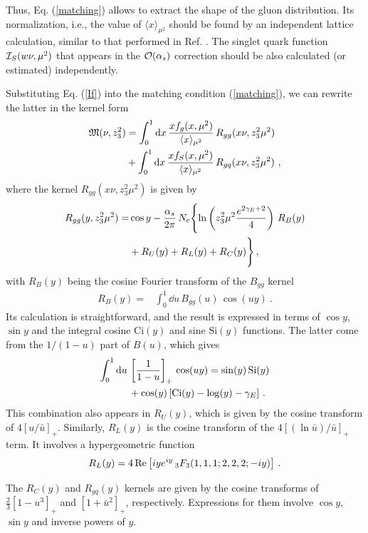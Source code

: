 Thus, Eq. (\ref{matching}) allows to extract the shape of the gluon distribution.
Its normalization, i.e., the value of $\langle x \rangle_{\mu^2}$ should be
found by an independent lattice calculation, similar to that performed
in Ref. \cite{Yang:2018bft}.
The singlet quark function ${\cal I}_S (w \nu, \mu^2)$ that appears in the
${\cal O} (\alpha_s)$ correction should be also calculated (or estimated)
independently.

Substituting Eq. (\ref{If}) into the matching condition (\ref{matching}), we can
rewrite the latter in the kernel form \cite{Radyushkin:2019owq}
\begin{align}
{\mathfrak M}(\nu,z_3^2) & =
\int_{0}^1 \mathrm{d} x \,
\frac{x {f}_g (x,\mu^2) }{\langle x \rangle_{\mu^2}} \, R_{gg} (x \nu, z_3^2 \mu^2 ) \nonumber \\  &
+
\int_{0}^1 \mathrm{d} x \,
\frac{x {f}_S (x,\mu^2) }{\langle x \rangle_{\mu^2}} \, R_{gq} (x \nu, z_3^2 \mu^2 ) \
,
\label{MtchI}
\end{align}
where the kernel $R_{gg} (x \nu, z_3^2 \mu^2 )$
is given by
\begin{align}
R_{gg}(y, z_3^2 \mu^2) =& \cos y
- \frac{\alpha_s}{2\pi} \, N_c
\Biggl \{ \ln \left ( z_3^2 \mu^2\frac{e^{2\gamma_E+2}}{4} \right ) \,
R_B(y)\nonumber \\  & +R_U (y)
+R_L(y) +R_C(y) \Biggr \} \, ,
\label{MtchR}
\end{align}
with $R_B(y)$ being
the cosine Fourier transform of the $B_{gg}$ kernel
\begin{align}
R_B(y) =& \int_0^1 \dd u \, B_{gg} (u) \, \cos (u y) \ .
\label{RB}
\end{align}
Its calculation is straightforward, and the result is expressed in terms of $\cos y$, $\sin y$
and the integral cosine $\text{Ci}(y)$ and sine $\text{Si}(y)$ functions.
The latter come from the $1/(1-u)$ part of $B(u)$, which gives
\begin{align}
\int_0^1 \mathrm{d} u \, & \left[ \frac1{1-u} \right ]_+ \, \cos (u y) = \sin (y) \, \text{Si}(y) \nonumber \\  & +\cos (y)\,
[\text{Ci}(y)-\log (y)-\gamma_E ]
\ .
\label{RB0}
\end{align}
This combination also appears in $R_U(y)$, which is given by the cosine transform of $4[u/\bar u]_+$.
Similarly, $R_L(y)$ is the cosine transform of the \mbox{$4[(\ln \bar u)/\bar u]_+$} term.
It involves a hypergeometric function
\begin{align}
R_L(y) =
4\, {\rm Re} \left [ i y e^{i y} \,
_3F_3(1,1,1;2,2,2;-i y) \right ] \, .
\label{MtchRL}
\end{align}

The $R_C(y)$ and $R_{gq} (y)$ kernels are given by the cosine transforms of $\frac23 \left [ 1-u^3
\right ]_+$ and $\left [ 1+\bar u^2\right]_+$, respectively.
Expressions for them
involve $\cos y$, $\sin y$ and inverse powers of $y$.

